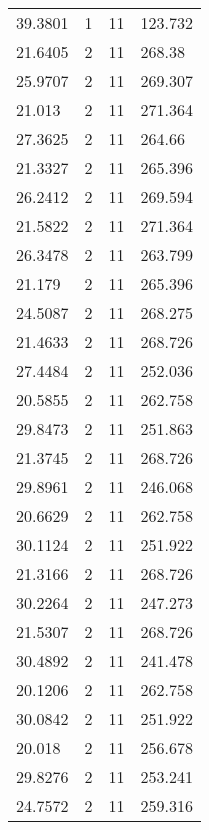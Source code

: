 \documentclass[bwprint]{gmcmthesis}
\begin{document}
\begin{longtable}{llll}
39.3801   & 1           & 11          & 123.732   \\
21.6405   & 2           & 11          & 268.38    \\
25.9707   & 2           & 11          & 269.307   \\
21.013    & 2           & 11          & 271.364   \\
27.3625   & 2           & 11          & 264.66    \\
21.3327   & 2           & 11          & 265.396   \\
26.2412   & 2           & 11          & 269.594   \\
21.5822   & 2           & 11          & 271.364   \\
26.3478   & 2           & 11          & 263.799   \\
21.179    & 2           & 11          & 265.396   \\
24.5087   & 2           & 11          & 268.275   \\
21.4633   & 2           & 11          & 268.726   \\
27.4484   & 2           & 11          & 252.036   \\
20.5855   & 2           & 11          & 262.758   \\
29.8473   & 2           & 11          & 251.863   \\
21.3745   & 2           & 11          & 268.726   \\
29.8961   & 2           & 11          & 246.068   \\
20.6629   & 2           & 11          & 262.758   \\
30.1124   & 2           & 11          & 251.922   \\
21.3166   & 2           & 11          & 268.726   \\
30.2264   & 2           & 11          & 247.273   \\
21.5307   & 2           & 11          & 268.726   \\
30.4892   & 2           & 11          & 241.478   \\
20.1206   & 2           & 11          & 262.758   \\
30.0842   & 2           & 11          & 251.922   \\
20.018    & 2           & 11          & 256.678   \\
29.8276   & 2           & 11          & 253.241   \\
24.7572   & 2           & 11          & 259.316   \\

\end{longtable}
\end{document}
